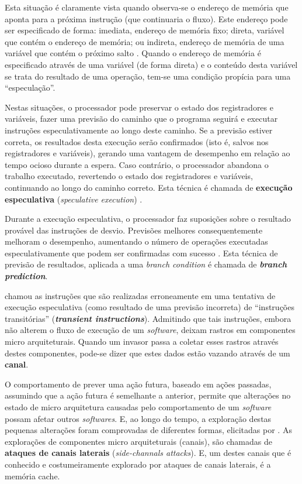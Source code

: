 \documentclass[
	article,			    %
	12pt,				    %
	oneside,			    %
	a4paper,			    %
	chapter=TITLE,		    %
	section=TITLE,		    %
	subsection=TITLE,	    %
	english,			    %
	brazil,				    %
	sumario=tradicional
]{abntex2}
\begin{document}
Esta situação é claramente vista quando observa-se o endereço de memória que aponta para a próxima instrução (que continuaria o fluxo). Este endereço pode ser especificado de forma: imediata, endereço de memória fixo; direta, variável que contém o endereço de memória; ou indireta, endereço de memória de uma variável que contém o próximo salto \cite{Debarshi2018Addressing}. Quando o endereço de memória é especificado através de uma variável (de forma direta) e o conteúdo desta variável se trata do resultado de uma operação, tem-se uma condição propícia para uma ``especulação''.

Nestas situações, o processador pode preservar o estado dos registradores e variáveis, fazer uma previsão do caminho que o programa seguirá e executar instruções especulativamente ao longo deste caminho. Se a previsão estiver correta, os resultados desta execução serão confirmados (isto é, salvos nos registradores e variáveis), gerando uma vantagem de desempenho em relação ao tempo ocioso durante a espera. Caso contrário, o processador abandona o trabalho executado, revertendo o estado dos registradores e variáveis, continuando ao longo do caminho correto. Esta técnica é chamada de \textbf{execução especulativa} (\emph{speculative execution}) \cite{Kocher2018Spectre}.

Durante a execução especulativa, o processador faz suposições sobre o resultado provável das instruções de desvio. Previsões melhores consequentemente melhoram o desempenho, aumentando o número de operações executadas especulativamente que podem ser confirmadas com sucesso \cite{Kocher2018Spectre}. Esta técnica de previsão de resultados, aplicada a uma \emph{branch condition} é chamada de \textbf{\emph{branch prediction}}.

 chamou as instruções que são realizadas erroneamente em uma tentativa de execução especulativa (como resultado de uma previsão incorreta) de ``instruções transitórias'' (\textbf{\emph{transient instructions}}). Admitindo que tais instruções, embora não alterem o fluxo de execução de um \emph{software}, deixam rastros em componentes micro arquiteturais. Quando um invasor passa a coletar esses rastros através destes componentes, pode-se dizer que estes dados estão vazando através de um \textbf{canal}.

O comportamento de prever uma ação futura, baseado em ações passadas, assumindo que a ação futura é semelhante a anterior, permite que alterações no estado de micro arquitetura causadas pelo comportamento de um \emph{software} possam afetar outros \emph{softwares}. E, ao longo do tempo, a exploração destas pequenas alterações foram comprovadas de diferentes formas, elicitadas por . As explorações de componentes micro arquiteturais (canais), são chamadas de \textbf{ataques de canais laterais} (\emph{side-channals attacks}). E, um destes canais que é conhecido e costumeiramente explorado por ataques de canais laterais, é a memória cache.
\end{document}
